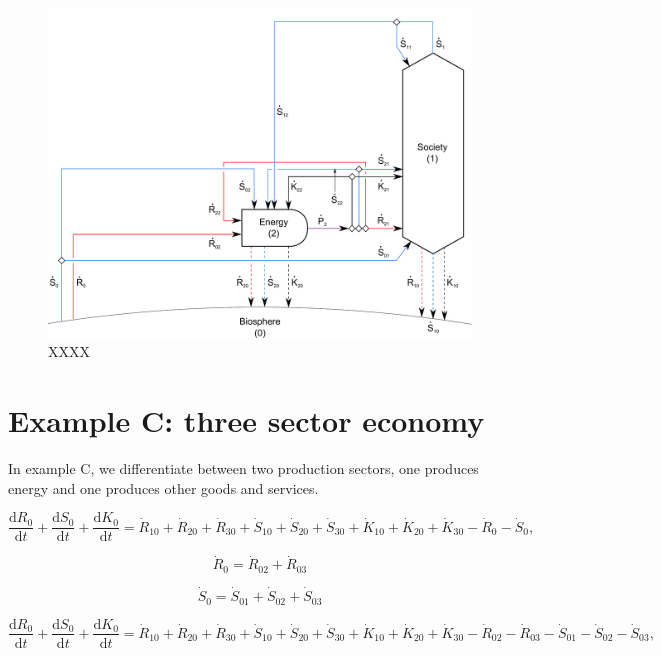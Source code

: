 \begin{figure}[h!]
\centering
\includegraphics[width=0.8\linewidth]{Part_1/Chapter_Materials/images/2_sector_materials.pdf}
\caption{XXXX}
\label{fig:B_materials}
\end{figure}

\section{Example C: three sector economy}
\label{sec:C_materials}

In example C, we differentiate between two production sectors, one produces energy and one produces other goods and services.


\begin{equation} \label{eq:C-CV_R_dot_0a}
	\frac{\mathrm{d}R_{0}}{\mathrm{d}t} 
	+ \frac{\mathrm{d}S_{0}}{\mathrm{d}t}	
	+ \frac{\mathrm{d}K_0}{\mathrm{d}t}
	=  \dot{R}_{10} + \dot{R}_{20} + \dot{R}_{30}
	+ \dot{S}_{10} + \dot{S}_{20} + \dot{S}_{30}
	+ \dot{K}_{10} + \dot{K}_{20} + \dot{K}_{30}
	- \dot{R}_{0} 
	- \dot{S}_{0},
\end{equation}

\begin{equation}
	\dot{R}_{0} = \dot{R}_{02} + \dot{R}_{03}
\end{equation}

\begin{equation}
	\dot{S}_{0} = \dot{S}_{01} + \dot{S}_{02} + \dot{S}_{03}
\end{equation}

 \begin{equation} \label{eq:C-CV_R_dot_0b}
 	\frac{\mathrm{d}R_{0}}{\mathrm{d}t} 
 	+ \frac{\mathrm{d}S_{0}}{\mathrm{d}t}	
 	+ \frac{\mathrm{d}K_0}{\mathrm{d}t}
 	=  \dot{R}_{10} + \dot{R}_{20} + \dot{R}_{30}
 	+ \dot{S}_{10} + \dot{S}_{20} + \dot{S}_{30}
 	+ \dot{K}_{10} + \dot{K}_{20} + \dot{K}_{30}
 	- \dot{R}_{02} - \dot{R}_{03} 
 	- \dot{S}_{01} - \dot{S}_{02} - \dot{S}_{03},
 \end{equation}
 
